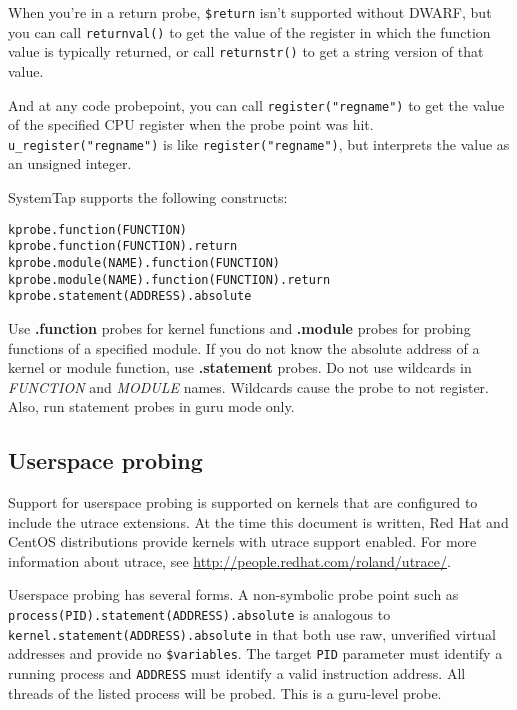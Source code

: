 \documentclass[twoside,english]{article}
\newenvironment{vindent}
{\begin{list}{}{\setlength{\listparindent}{6pt}}
\item[]}
{\end{list}}
\begin{document}
When you're in a return probe, \texttt{\$return} isn't supported
without DWARF, but you can call \texttt{returnval()} to get the value
of the register in which the function value is typically returned, or
call \texttt{returnstr()} to get a string version of that value.

And at any code probepoint, you can call
\texttt{{register("regname")}} to get the value of the specified CPU
register when the probe point was hit.
\texttt{u\_register("regname")} is like \texttt{register("regname")},
but interprets the value as an unsigned integer.

SystemTap supports the following constructs:
\begin{vindent}
\begin{verbatim}
kprobe.function(FUNCTION)
kprobe.function(FUNCTION).return
kprobe.module(NAME).function(FUNCTION)
kprobe.module(NAME).function(FUNCTION).return
kprobe.statement(ADDRESS).absolute
\end{verbatim}
\end{vindent}

Use \textbf{.function} probes for kernel functions and
\textbf{.module} probes for probing functions of a specified module.
If you do not know the absolute address of a kernel or module
function, use \textbf{.statement} probes. Do not use wildcards in
\textit{FUNCTION} and \textit{MODULE} names. Wildcards cause the probe
to not register. Also, run statement probes in guru mode only.


\subsection{Userspace probing}
Support for userspace probing is supported on kernels that are
configured to include the utrace extensions.  At the time this
document is written, Red Hat and CentOS distributions provide kernels
with utrace support enabled.  For more information about utrace, see
\url{http://people.redhat.com/roland/utrace/}.

Userspace probing has several forms.  A non-symbolic probe point such
as \newline\texttt{process(PID).statement(ADDRESS).absolute} is
analogous to \texttt{kernel.statement(ADDRESS).absolute} in that both
use raw, unverified virtual addresses and provide no
\texttt{\$variables}.  The target \texttt{PID} parameter must identify
a running process and \texttt{ADDRESS} must identify a valid
instruction address.  All threads of the listed process will be
probed.  This is a guru-level probe.
\end{document}
